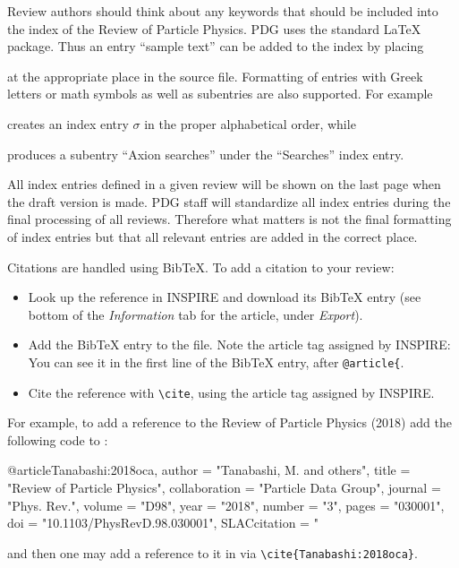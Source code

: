 \label{sec:index}

Review authors should think about any keywords that should be included into the index of the Review of Particle Physics. PDG uses the standard \LaTeX\   package. Thus an entry ``sample text'' can be added to the index by placing
\begin{verbtex}
\end{verbtex}
at the appropriate place in the source file. Formatting of entries with Greek letters or math symbols as well as subentries are also supported. For example
\begin{verbtex}
\end{verbtex}
creates an index entry $\sigma$ in the proper alphabetical order, while
\begin{verbtex}
\end{verbtex}
produces a subentry ``Axion searches'' under the ``Searches'' index entry.

All index entries defined in a given review will be shown on the last page when the draft version is made. PDG staff will standardize all index entries during the final processing of all reviews. Therefore what matters is not the final formatting of index entries but that all relevant entries are added in the correct place.


\label{sec:cites}

Citations are handled using BibTeX. To add a citation to your review:
\begin{itemize}
\item Look up the reference in INSPIRE and download its BibTeX entry (see bottom of the \emph{Information} tab for the article, under \emph{Export}).
\item Add the BibTeX entry to the  file. Note the article tag assigned by INSPIRE: You can see it in the first line of the BibTeX entry, after \lstinline!@article{!.
\item Cite the reference with \lstinline{\cite}, using the article tag assigned by INSPIRE.
\end{itemize}

For example, to add a reference to the Review of Particle Physics (2018) 
add the following code to :
\begin{verbtex}
@article{Tanabashi:2018oca,
      author         = "Tanabashi, M. and others",
      title          = "{Review of Particle Physics}",
      collaboration  = "Particle Data Group",
      journal        = "Phys. Rev.",
      volume         = "D98",
      year           = "2018",
      number         = "3",
      pages          = "030001",
      doi            = "10.1103/PhysRevD.98.030001",
      SLACcitation   = "%
 }
\end{verbtex}
and then one may add a reference to it in  via \lstinline!\cite{Tanabashi:2018oca}!.

